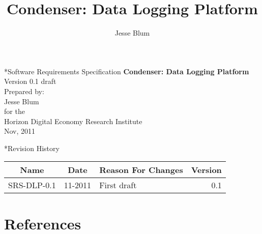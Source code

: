\documentclass[11pt,a4paper,draft]{article}
\author{Jesse Blum}
\title{Condenser: Data Logging Platform}
\begin{document}
\thispagestyle{empty}
\begin{center}
    \begin{section}*{Software Requirements Specification}     
    \textbf{Condenser: Data Logging Platform}\\
    \medskip
    Version 0.1 draft\\    
    \bigskip
    Prepared by:\\
    Jesse Blum\\
    for the\\
    Horizon Digital Economy Research Institute\\
    Nov, 2011
    \end{section}
\end{center}   
    \bigskip	
    \bigskip
    \bigskip
\begin{center}
    \begin{section}*{Revision History}
    \begin{tabular}{|c|c|l|r|}
    \hline
    \textbf{Name}
    &
    \textbf{Date}
    &
    \textbf{Reason For Changes}
    &
    \textbf{Version}\\
    \hline
    SRS-DLP-0.1&11-2011&First draft&0.1\\
    \hline
    \end{tabular}
    \end{section}
 \end{center} 
    \newpage
    \pagestyle{myheadings}
    \tableofcontents
    \newpage
    
	
	
\section{References}


\end{document}
